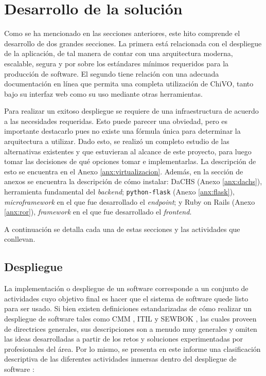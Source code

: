 \section{Desarrollo de la solución}

Como se ha mencionado en las secciones anteriores, este hito comprende el
desarrollo de dos grandes secciones. La primera está relacionada con el
despliegue de la aplicación, de tal manera de contar con una arquitectura
moderna, escalable, segura y por sobre los estándares mínimos requeridos para la
producción de software. El segundo tiene relación con una adecuada documentación
en línea que permita una completa utilización de ChiVO, tanto bajo su interfaz
web como su uso mediante otras herramientas.

Para realizar un exitoso despliegue se requiere de una infraestructura de
acuerdo a las necesidades requeridas. Esto puede parecer una obviedad, pero es
importante destacarlo pues no existe una fórmula única para determinar la
arquitectura a utilizar. Dado esto, se realizó un completo estudio de las
alternativas existentes y que estuvieran al alcance de este proyecto, para luego
tomar las decisiones de qu\'e opciones tomar e implementarlas. La descripción de
esto se encuentra en el Anexo \ref{anx:virtualizacion}. Además, en la sección de
anexos se encuentra la descripción de cómo instalar: DaCHS (Anexo
\ref{anx:dachs}), herramienta fundamental del \emph{backend};
\texttt{python-flask} (Anexo \ref{anx:flask}), \emph{microframework} en el que
fue desarrollado el \emph{endpoint}; y Ruby on Rails (Anexo \ref{anx:ror}),
\emph{framework} en el que fue desarrollado el \emph{frontend}.

A continuación se detalla cada una de estas secciones y las actividades que conllevan.

\subsection{Despliegue}

La implementación o despliegue de un software corresponde a un conjunto de
actividades cuyo objetivo final es hacer que el sistema de software quede listo
para ser usado. Si bien existen definiciones estandarizadas de cómo realizar un
despliegue de software tales como CMM \cite{cmm}, ITIL \cite{itil} y SEWBOK
\cite{swebok}, las cuales proveen de directrices generales, sus descripciones
son a menudo muy generales y omiten las ideas desarrolladas a partir de los
retos y soluciones experimentadas por profesionales del área. Por lo mismo, se
presenta en este informe una clasificación descriptiva de las diferentes
actividades inmersas dentro del despliegue de software \cite{deployActivities}:


